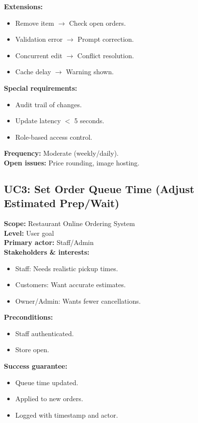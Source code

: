 \documentclass{article}
\begin{document}
\textbf{Extensions:}
\begin{itemize}
    \item Remove item $\rightarrow$ Check open orders.
    \item Validation error $\rightarrow$ Prompt correction.
    \item Concurrent edit $\rightarrow$ Conflict resolution.
    \item Cache delay $\rightarrow$ Warning shown.
\end{itemize}

\textbf{Special requirements:}
\begin{itemize}
    \item Audit trail of changes.
    \item Update latency $<$ 5 seconds.
    \item Role-based access control.
\end{itemize}

\textbf{Frequency:} Moderate (weekly/daily).\\
\textbf{Open issues:} Price rounding, image hosting.

\subsection*{UC3: Set Order Queue Time (Adjust Estimated Prep/Wait)}
\textbf{Scope:} Restaurant Online Ordering System \\
\textbf{Level:} User goal \\
\textbf{Primary actor:} Staff/Admin \\

\textbf{Stakeholders \& interests:}
\begin{itemize}
    \item Staff: Needs realistic pickup times.
    \item Customers: Want accurate estimates.
    \item Owner/Admin: Wants fewer cancellations.
\end{itemize}

\textbf{Preconditions:}
\begin{itemize}
    \item Staff authenticated.
    \item Store open.
\end{itemize}

\textbf{Success guarantee:}
\begin{itemize}
    \item Queue time updated.
    \item Applied to new orders.
    \item Logged with timestamp and actor.
\end{itemize}
\end{document}
